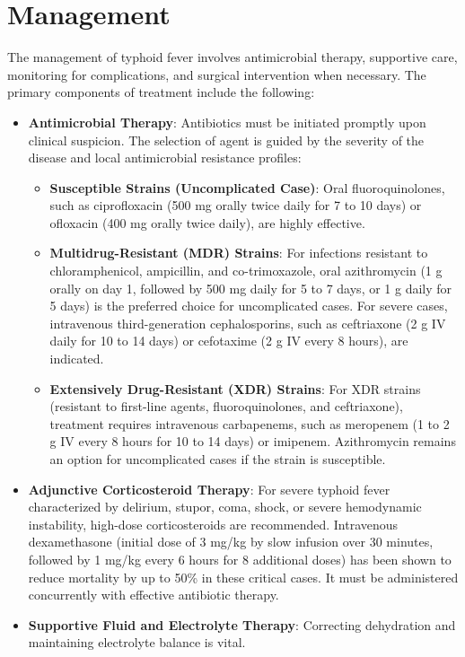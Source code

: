 \section*{Management}
The management of typhoid fever involves antimicrobial therapy, supportive care, monitoring for complications, and surgical intervention when necessary. The primary components of treatment include the following:
\begin{itemize}
  \item \textbf{Antimicrobial Therapy}: Antibiotics must be initiated promptly upon clinical suspicion. The selection of agent is guided by the severity of the disease and local antimicrobial resistance profiles:
  \begin{itemize}
    \item \textbf{Susceptible Strains (Uncomplicated Case)}: Oral fluoroquinolones, such as ciprofloxacin (500 mg orally twice daily for 7 to 10 days) or ofloxacin (400 mg orally twice daily), are highly effective.
    \item \textbf{Multidrug-Resistant (MDR) Strains}: For infections resistant to chloramphenicol, ampicillin, and co-trimoxazole, oral azithromycin (1 g orally on day 1, followed by 500 mg daily for 5 to 7 days, or 1 g daily for 5 days) is the preferred choice for uncomplicated cases. For severe cases, intravenous third-generation cephalosporins, such as ceftriaxone (2 g IV daily for 10 to 14 days) or cefotaxime (2 g IV every 8 hours), are indicated.
    \item \textbf{Extensively Drug-Resistant (XDR) Strains}: For XDR strains (resistant to first-line agents, fluoroquinolones, and ceftriaxone), treatment requires intravenous carbapenems, such as meropenem (1 to 2 g IV every 8 hours for 10 to 14 days) or imipenem. Azithromycin remains an option for uncomplicated cases if the strain is susceptible.
  \end{itemize}
  \item \textbf{Adjunctive Corticosteroid Therapy}: For severe typhoid fever characterized by delirium, stupor, coma, shock, or severe hemodynamic instability, high-dose corticosteroids are recommended. Intravenous dexamethasone (initial dose of 3 mg/kg by slow infusion over 30 minutes, followed by 1 mg/kg every 6 hours for 8 additional doses) has been shown to reduce mortality by up to 50\% in these critical cases. It must be administered concurrently with effective antibiotic therapy.
  \item \textbf{Supportive Fluid and Electrolyte Therapy}: Correcting dehydration and maintaining electrolyte balance is vital.

\end{itemize}

